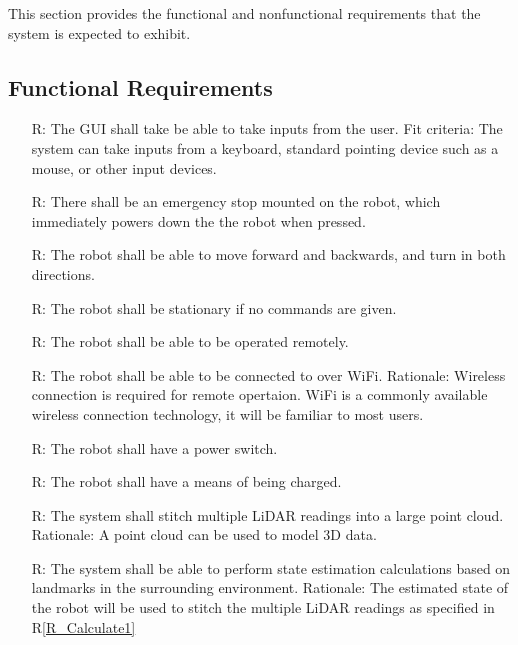 \documentclass[12pt]{article}
\newcounter{reqnum} %
\newcommand{\rref}[1]{R\ref{#1}}
\begin{document}

This section provides the functional and nonfunctional requirements that the
system is expected to exhibit.

\subsection{Functional Requirements}

\noindent \begin{itemize}

\item[R\refstepcounter{reqnum}\thereqnum \label{R_Inputs1}:] The GUI shall take be able to take inputs from the user. 
\newline Fit criteria: The system can take inputs from a keyboard, standard pointing device such as a mouse, or other input devices.
\item[R\refstepcounter{reqnum}\thereqnum \label{R_Inputs2}:] There shall be an emergency stop mounted on the robot, which immediately powers down the the robot when pressed.
\item[R\refstepcounter{reqnum}\thereqnum \label{R_Inputs3}:] The robot shall be able to move forward and backwards, and turn in both directions.
\item[R\refstepcounter{reqnum}\thereqnum \label{R_Inputs4}:] The robot shall be stationary if no commands are given.
\item[R\refstepcounter{reqnum}\thereqnum \label{R_Inputs5}:] The robot shall be able to be operated remotely.
\item[R\refstepcounter{reqnum}\thereqnum \label{R_Inputs6}:] The robot shall be able to be connected to over WiFi.
\newline Rationale: Wireless connection is required for remote opertaion. WiFi is a commonly available wireless connection technology, it will be familiar to most users. 
\item[R\refstepcounter{reqnum}\thereqnum \label{R_Inputs7}:] The robot shall have a power switch.
\item[R\refstepcounter{reqnum}\thereqnum \label{R_Inputs8}:] The robot shall have a means of being charged.
\item[R\refstepcounter{reqnum}\thereqnum \label{R_Calculate1}:] The system shall stitch multiple LiDAR readings into a large point cloud.
\newline Rationale: A point cloud can be used to model 3D data.
\item[R\refstepcounter{reqnum}\thereqnum \label{R_Calculate2}:] The system shall be able to perform state estimation calculations based on landmarks in the surrounding environment.
\newline Rationale: The estimated state of the robot will be used to stitch the multiple LiDAR readings as specified in \rref{R_Calculate1} 


\end{itemize}
\end{document}
